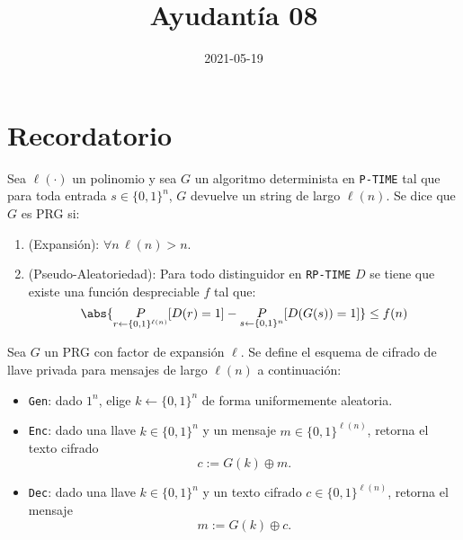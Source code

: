 \documentclass{ayudantia}
\title{Ayudantía 08}
\subtitle{}
\date{2021-05-19}
\begin{document}
\maketitle
\section{Recordatorio}
\begin{defn}
    Sea \(\ell(\cdot)\) un polinomio y sea \(G\) un algoritmo determinista en \texttt{P-TIME} tal que para toda entrada \(s\in\{0,1\}^n\), \(G\) devuelve un string de largo \(\ell(n)\). Se dice que \(G\) es PRG si:
    \begin{enumerate}
        \item (Expansión): \(\forall n\,\ell(n)>n\).
        \item (Pseudo-Aleatoriedad): Para todo distinguidor en \texttt{RP-TIME} \(D\) se tiene que existe una función despreciable \(f\) tal que:
        \begin{equation*}
            \abs{\underset{r\leftarrow\{0,1\}^{\ell(n)}}{P}[D(r)=1]-\underset{s\leftarrow\{0,1\}^n}{P}[D(G(s))=1]}\leq f(n)
        \end{equation*}
    \end{enumerate}
\end{defn}

\begin{defn}
    Sea \(G\) un PRG con factor de expansión \(\ell\). Se define el esquema de cifrado de llave privada para mensajes de largo \(\ell(n)\) a continuación:
    \begin{itemize}
        \item \texttt{Gen}: dado \(1^n\), elige \(k\leftarrow\{0,1\}^n\) de forma uniformemente aleatoria.
        \item \texttt{Enc}: dado una llave \(k\in\{0,1\}^n\) y un mensaje \(m\in\{0,1\}^{\ell(n)}\), retorna el texto cifrado
        \begin{equation*}
            c:=G(k)\oplus m.
        \end{equation*}
        \item \texttt{Dec}: dado una llave \(k\in\{0,1\}^n\) y un texto cifrado \(c\in\{0,1\}^{\ell(n)}\), retorna el mensaje
        \begin{equation*}
            m:=G(k)\oplus c.
        \end{equation*}
    \end{itemize}
\end{defn}
\end{document}

